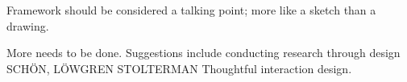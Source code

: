 Framework should be considered a talking point; more like a sketch than a drawing.

More needs to be done. Suggestions include conducting research through design SCHÖN, LÖWGREN STOLTERMAN Thoughtful interaction design.
